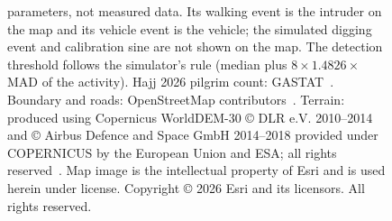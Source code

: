 \begin{figure}[t]
{  parameters, not measured data. Its walking event is the intruder on the map and its vehicle event is the vehicle;
  the simulated digging event and calibration sine are not shown on the map. The detection threshold follows the
  simulator's rule (median plus $8\times1.4826\times$ MAD of the activity).
  Hajj 2026 pilgrim count: GASTAT~\cite{gastat2026hajjnews}.
  Boundary and roads: OpenStreetMap contributors~\cite{osm_contributors}. Terrain: produced using Copernicus WorldDEM-30
  \copyright{} DLR e.V. 2010--2014 and \copyright{} Airbus Defence and Space GmbH 2014--2018 provided under COPERNICUS by the
  European Union and ESA; all rights reserved~\cite{copernicus_dem_glo30}.
  Map image is the intellectual property of Esri and is used herein under license.
  Copyright \copyright{} 2026 Esri and its licensors. All rights reserved.~\cite{esri_world_imagery}}
  \label{fig:digital-twin}
\end{figure}
